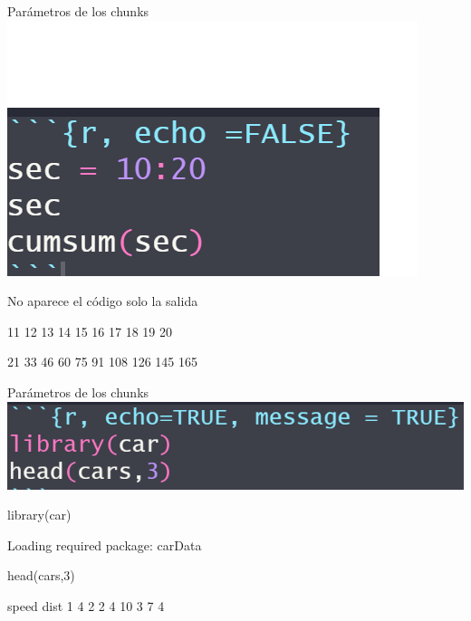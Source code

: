 \documentclass[
  ignorenonframetext,
  aspectratio=169]{beamer}
\newenvironment{Shaded}{\begin{snugshade}}{\end{snugshade}}
\newcommand{\DecValTok}[1]{\textcolor[rgb]{0.00,0.00,0.81}{#1}}
\newcommand{\FunctionTok}[1]{\textcolor[rgb]{0.00,0.00,0.00}{#1}}
\newcommand{\NormalTok}[1]{#1}
\let\oldverbatim\verbatim
\let\endoldverbatim\endverbatim
\renewenvironment{verbatim}{\tiny\oldverbatim}{\endoldverbatim}
\begin{document}
\begin{frame}[fragile]{Parámetros de los chunks}
\protect\hypertarget{paruxe1metros-de-los-chunks-3}{}
\includegraphics[width=0.5\linewidth]{Imgs/no_aparece}

No aparece el código solo la salida

\begin{verbatim}
 [1] 10 11 12 13 14 15 16 17 18 19 20
\end{verbatim}

\begin{verbatim}
 [1]  10  21  33  46  60  75  91 108 126 145 165
\end{verbatim}
\end{frame}

\begin{frame}[fragile]{Parámetros de los chunks}
\protect\hypertarget{paruxe1metros-de-los-chunks-4}{}
\includegraphics[width=0.6\linewidth]{Imgs/parametros_chunk_2}

\begin{Shaded}
\begin{Highlighting}[]
\FunctionTok{library}\NormalTok{(car)}
\end{Highlighting}
\end{Shaded}

\begin{verbatim}
Loading required package: carData
\end{verbatim}

\begin{Shaded}
\begin{Highlighting}[]
\FunctionTok{head}\NormalTok{(cars,}\DecValTok{3}\NormalTok{)}
\end{Highlighting}
\end{Shaded}

\begin{verbatim}
  speed dist
1     4    2
2     4   10
3     7    4
\end{verbatim}
\end{frame}
\end{document}
